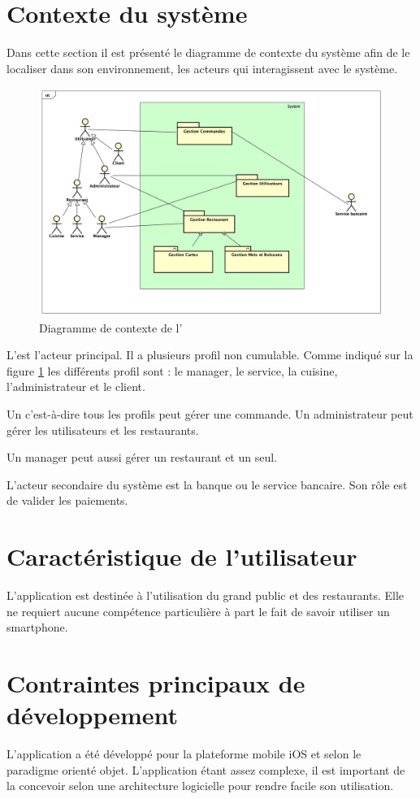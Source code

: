 \section{Contexte du système}
Dans cette section il est présenté le diagramme de contexte du système afin de le localiser dans son environnement, les acteurs qui interagissent  avec le système.
\begin{figure}[H]
	\centering
	\includegraphics[scale=0.4]{assets/images/Restaurant_system.png}
	\caption{Diagramme de contexte de l'\ar}
	\label{fig.9}
\end{figure}
L'\ut est l'acteur principal. Il a plusieurs profil non cumulable. Comme indiqué sur la figure \ref{fig.9} les différents profil sont : le manager, le service, la cuisine, l'administrateur et le client. 

Un \ut c'est-à-dire tous les profils peut gérer une commande. Un administrateur peut gérer les utilisateurs et les restaurants.

Un manager peut aussi gérer un restaurant et un seul.

L'acteur secondaire du système est la banque ou le service bancaire. Son rôle est de valider les paiements.

\section{Caractéristique de l'utilisateur}
L'application est destinée à l'utilisation du grand public et des restaurants. Elle ne requiert aucune compétence particulière à part le fait de savoir utiliser un smartphone.

\section{Contraintes principaux de développement}
L'application a été développé pour la plateforme mobile iOS et selon le paradigme orienté objet. L'application étant assez complexe, il est important de la concevoir selon une architecture logicielle pour rendre facile son utilisation.

